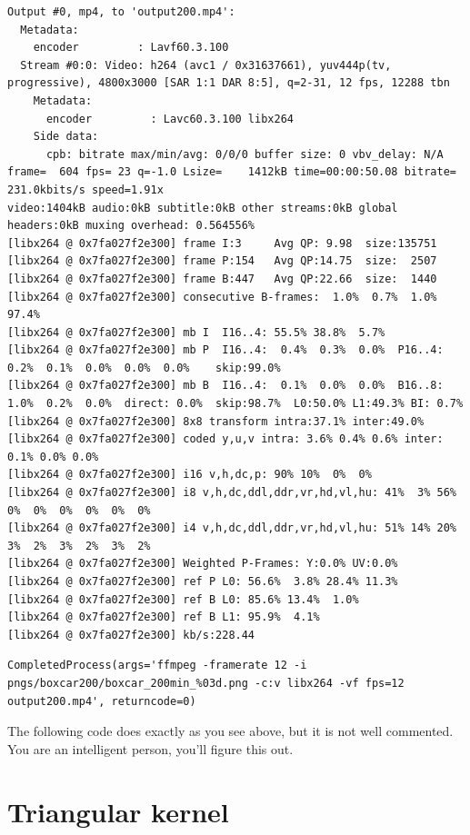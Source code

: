 \documentclass[
  letterpaper,
  DIV=11,
  numbers=noendperiod,
  oneside]{scrreprt}
\begin{document}
\begin{verbatim}
Output #0, mp4, to 'output200.mp4':
  Metadata:
    encoder         : Lavf60.3.100
  Stream #0:0: Video: h264 (avc1 / 0x31637661), yuv444p(tv, progressive), 4800x3000 [SAR 1:1 DAR 8:5], q=2-31, 12 fps, 12288 tbn
    Metadata:
      encoder         : Lavc60.3.100 libx264
    Side data:
      cpb: bitrate max/min/avg: 0/0/0 buffer size: 0 vbv_delay: N/A
frame=  604 fps= 23 q=-1.0 Lsize=    1412kB time=00:00:50.08 bitrate= 231.0kbits/s speed=1.91x     
video:1404kB audio:0kB subtitle:0kB other streams:0kB global headers:0kB muxing overhead: 0.564556%
[libx264 @ 0x7fa027f2e300] frame I:3     Avg QP: 9.98  size:135751
[libx264 @ 0x7fa027f2e300] frame P:154   Avg QP:14.75  size:  2507
[libx264 @ 0x7fa027f2e300] frame B:447   Avg QP:22.66  size:  1440
[libx264 @ 0x7fa027f2e300] consecutive B-frames:  1.0%  0.7%  1.0% 97.4%
[libx264 @ 0x7fa027f2e300] mb I  I16..4: 55.5% 38.8%  5.7%
[libx264 @ 0x7fa027f2e300] mb P  I16..4:  0.4%  0.3%  0.0%  P16..4:  0.2%  0.1%  0.0%  0.0%  0.0%    skip:99.0%
[libx264 @ 0x7fa027f2e300] mb B  I16..4:  0.1%  0.0%  0.0%  B16..8:  1.0%  0.2%  0.0%  direct: 0.0%  skip:98.7%  L0:50.0% L1:49.3% BI: 0.7%
[libx264 @ 0x7fa027f2e300] 8x8 transform intra:37.1% inter:49.0%
[libx264 @ 0x7fa027f2e300] coded y,u,v intra: 3.6% 0.4% 0.6% inter: 0.1% 0.0% 0.0%
[libx264 @ 0x7fa027f2e300] i16 v,h,dc,p: 90% 10%  0%  0%
[libx264 @ 0x7fa027f2e300] i8 v,h,dc,ddl,ddr,vr,hd,vl,hu: 41%  3% 56%  0%  0%  0%  0%  0%  0%
[libx264 @ 0x7fa027f2e300] i4 v,h,dc,ddl,ddr,vr,hd,vl,hu: 51% 14% 20%  3%  2%  3%  2%  3%  2%
[libx264 @ 0x7fa027f2e300] Weighted P-Frames: Y:0.0% UV:0.0%
[libx264 @ 0x7fa027f2e300] ref P L0: 56.6%  3.8% 28.4% 11.3%
[libx264 @ 0x7fa027f2e300] ref B L0: 85.6% 13.4%  1.0%
[libx264 @ 0x7fa027f2e300] ref B L1: 95.9%  4.1%
[libx264 @ 0x7fa027f2e300] kb/s:228.44
\end{verbatim}

\begin{verbatim}
CompletedProcess(args='ffmpeg -framerate 12 -i pngs/boxcar200/boxcar_200min_%03d.png -c:v libx264 -vf fps=12 output200.mp4', returncode=0)
\end{verbatim}

The following code does exactly as you see above, but it is not well
commented. You are an intelligent person, you'll figure this out.

\hypertarget{triangular-kernel}{%
\section{Triangular kernel}\label{triangular-kernel}}
\end{document}
